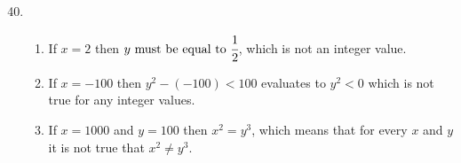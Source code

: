 \documentclass[11pt,a4paper,oneside]{article}
\begin{document}
\begin{enumerate}
\setcounter{enumi}{39} %
\item
\begin{enumerate} %
\item If \( x = 2 \) then \( y \textup{ must be equal to } \cfrac{1}{2} \), which is not an integer value.
\item If \( x = -100 \) then \( y^2 - (-100) < 100 \) evaluates to \( y^2 < 0 \) which is not true for any integer values.
\item If \( x = 1000 \) and \( y = 100 \) then \( x^2 = y^3 \), which means that for every $x$ and $y$ it is not true that \( x^2 \neq y^3 \).
\end{enumerate}

\end{enumerate}
\end{document}
